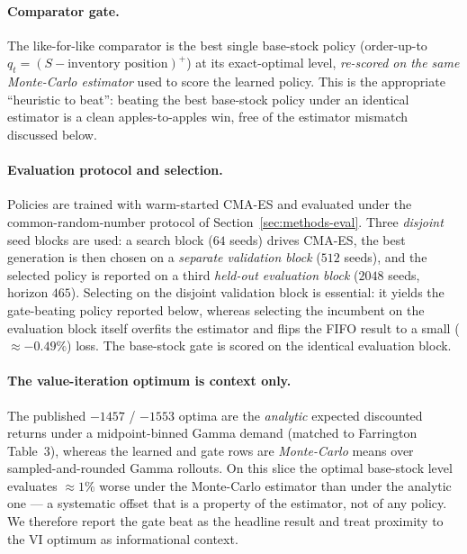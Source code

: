 \paragraph{Comparator gate.}
The like-for-like comparator is the best single base-stock policy (order-up-to
$q_t=(S-\text{inventory position})^+$) at its exact-optimal level, \emph{re-scored on the same
Monte-Carlo estimator} used to score the learned policy. This is the appropriate ``heuristic to
beat'': beating the best base-stock policy under an identical estimator is a clean apples-to-apples
win, free of the estimator mismatch discussed below.

\paragraph{Evaluation protocol and selection.}
Policies are trained with warm-started CMA-ES and evaluated under the common-random-number protocol of
Section~\ref{sec:methods-eval}. Three \emph{disjoint} seed blocks are used: a search block ($64$
seeds) drives CMA-ES, the best generation is then chosen on a \emph{separate validation block} ($512$
seeds), and the selected policy is reported on a third \emph{held-out evaluation block} ($2048$ seeds,
horizon $465$). Selecting on the disjoint validation block is essential: it yields the gate-beating
policy reported below, whereas selecting the incumbent on the evaluation block itself overfits the
estimator and flips the FIFO result to a small ($\approx-0.49\%$) loss. The base-stock gate is scored
on the identical evaluation block.

\paragraph{The value-iteration optimum is context only.}
The published $-1457$ / $-1553$ optima are the \emph{analytic} expected discounted returns under a
midpoint-binned Gamma demand (matched to Farrington Table~3), whereas the learned and gate rows are
\emph{Monte-Carlo} means over sampled-and-rounded Gamma rollouts. On this slice the optimal base-stock
level evaluates $\approx1\%$ worse under the Monte-Carlo estimator than under the analytic one --- a
systematic offset that is a property of the estimator, not of any policy. We therefore report the
gate beat as the headline result and treat proximity to the VI optimum as informational context.

